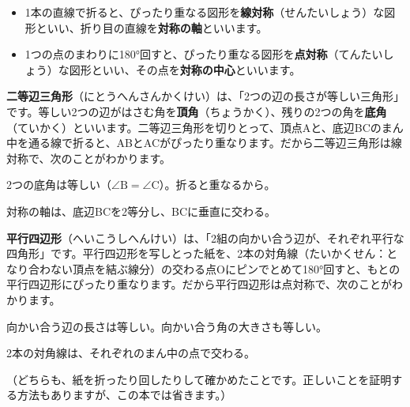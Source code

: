 \begin{itemize}[leftmargin=1.2\zw, itemsep=2pt, topsep=2pt, label={\color{bkTheme!80!black}●}]
\item 1本の直線で折ると、ぴったり重なる図形を\textbf{線対称}（せんたいしょう）な図形といい、折り目の直線を\textbf{対称の軸}といいます。
\item 1つの点のまわりに180°回すと、ぴったり重なる図形を\textbf{点対称}（てんたいしょう）な図形といい、その点を\textbf{対称の中心}といいます。
\end{itemize}

\textbf{二等辺三角形}（にとうへんさんかくけい）は、「2つの辺の長さが等しい三角形」です。等しい2つの辺がはさむ角を\textbf{頂角}（ちょうかく）、残りの2つの角を\textbf{底角}（ていかく）といいます。二等辺三角形を切りとって、頂点Aと、底辺BCのまん中を通る線で折ると、ABとACがぴったり重なります。だから二等辺三角形は線対称で、次のことがわかります。
\begin{enumerate}[label={\bkcircled[bkDeep]{\arabic*}}, leftmargin=2.4\zw, itemsep=1pt, topsep=2pt]
\item 2つの底角は等しい（$\angle\mathrm{B}=\angle\mathrm{C}$）。折ると重なるから。
\item 対称の軸は、底辺BCを2等分し、BCに垂直に交わる。
\end{enumerate}

\textbf{平行四辺形}（へいこうしへんけい）は、「2組の向かい合う辺が、それぞれ平行な四角形」です。平行四辺形を写しとった紙を、2本の対角線（たいかくせん：となり合わない頂点を結ぶ線分）の交わる点Oにピンでとめて180°回すと、もとの平行四辺形にぴったり重なります。だから平行四辺形は点対称で、次のことがわかります。
\begin{enumerate}[label={\bkcircled[bkDeep]{\arabic*}}, leftmargin=2.4\zw, itemsep=1pt, topsep=2pt]
\item 向かい合う辺の長さは等しい。向かい合う角の大きさも等しい。
\item 2本の対角線は、それぞれのまん中の点で交わる。
\end{enumerate}
（どちらも、紙を折ったり回したりして確かめたことです。正しいことを証明する方法もありますが、この本では省きます。）

